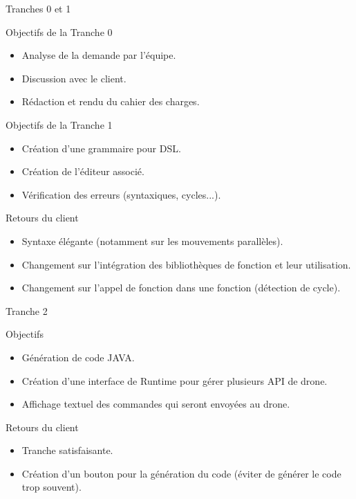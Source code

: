 \documentclass{bredelebeamer}
\begin{document}
\begin{frame}{Tranches 0 et 1}
\begin{alertblock}{Objectifs de la Tranche 0}
\begin{itemize}
\item Analyse de la demande  par l'équipe.
\item Discussion avec le client.
\item Rédaction et rendu du cahier des charges.
\end{itemize}
\end{alertblock}

\pause

\begin{alertblock}{Objectifs de la Tranche 1}
\begin{itemize}
\item Création d'une grammaire pour DSL.
\item Création de l'éditeur associé.
\item Vérification des erreurs (syntaxiques, cycles...).
\end{itemize}
\end{alertblock}

\pause

\begin{block}{Retours du client}
\begin{itemize}
\item Syntaxe élégante (notamment sur les mouvements parallèles).
\item Changement sur l'intégration des bibliothèques de fonction et leur utilisation.
\item Changement sur l'appel de fonction dans une fonction (détection de cycle).
\end{itemize}
\end{block}
\end{frame}

\begin{frame}{Tranche 2}
\begin{alertblock}{Objectifs}
\begin{itemize}
\item Génération de code JAVA.
\item Création d'une interface de Runtime pour gérer plusieurs API de drone.
\item Affichage textuel des commandes qui seront envoyées au drone.
\end{itemize}
\end{alertblock}

\pause

\begin{block}{Retours du client}
\begin{itemize}
\item Tranche satisfaisante.
\item Création d'un bouton pour la génération du code (éviter de générer le code trop souvent).
\end{itemize}
\end{block}
\end{frame}
\end{document}
